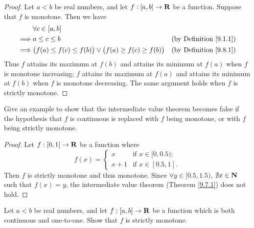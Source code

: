 \begin{proof}
    Let \(a < b\) be real numbers, and let \(f : [a, b] \to \mathbf{R}\) be a function.
    Suppose that \(f\) is monotone.
    Then we have
    \begin{align*}
                 & \forall c \in [a, b]                                                                                            \\
        \implies & a \leq c \leq b                                                            & \text{(by Definition \ref{9.1.1})} \\
        \implies & \big(f(a) \leq f(c) \leq f(b)\big) \lor \big(f(a) \geq f(c) \geq f(b)\big) & \text{(by Definition \ref{9.8.1})} \\
    \end{align*}
    Thus \(f\) attains its maximum at \(f(b)\) and attains its minimum at \(f(a)\) when \(f\) is monotone increasing;
    \(f\) attains its maximum at \(f(a)\) and attains its minimum at \(f(b)\) when \(f\) is monotone decreasing.
    The same argument holds when \(f\) is strictly monotone.
\end{proof}

\begin{exercise}\label{ex 9.8.2}
    Give an example to show that the intermediate value theorem becomes false if the hypothesis that \(f\) is continuous is replaced with \(f\) being monotone, or with \(f\) being strictly monotone.
\end{exercise}

\begin{proof}
    Let \(f : [0, 1] \to \mathbf{R}\) be a function where
    \[
        f(x) = \begin{cases}
            x     & \text{if } x \in [0, 0.5); \\
            x + 1 & \text{if } x \in [0.5, 1].
        \end{cases}
    \]
    Then \(f\) is strictly monotone and thus monotone.
    Since \(\forall y \in [0.5, 1.5)\), \(\nexists x \in \mathbf{N}\) such that \(f(x) = y\), the intermediate value theorem (Theorem \ref{9.7.1}) does not hold.
\end{proof}

\begin{exercise}\label{ex 9.8.3}
    Let \(a < b\) be real numbers, and let \(f : [a, b] \to \mathbf{R}\) be a function which is both continuous and one-to-one.
    Show that \(f\) is strictly monotone.
\end{exercise}


